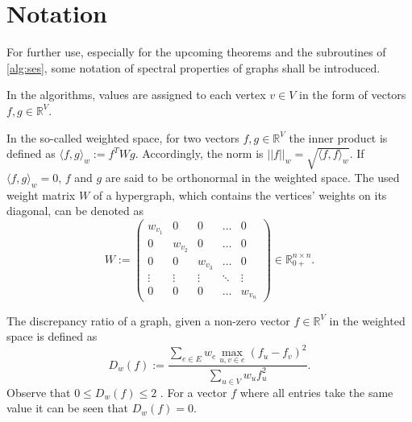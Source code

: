 \chapter{Notation}\label{chapter:notation}
For further use, especially for the upcoming theorems and the subroutines of \cref{alg:ses}, some notation of spectral properties of graphs shall be introduced.

In the algorithms, values are assigned to each vertex $v\in V$ in the form of vectors $f, g \in \mathbb{R}^V$. %

In the so-called weighted space, for two vectors $f, g \in \mathbb{R}^V$ the inner product is defined as $ \langle f,g \rangle_w := f^T W g$. Accordingly, the norm is $||f||_w = \sqrt{ \langle f,f \rangle_w}$.
If $ \langle f,g \rangle_w   = 0 $, $f$ and $g$ are said to be orthonormal in the weighted space. 
The used weight matrix $W$ of a hypergraph, which contains the vertices' weights on its diagonal, can be denoted as \begin{equation}
W := 
\begin{pmatrix}
w_{v_1} & 0 & 0&\dots &0 \\
0 & w_{v_2} & 0 & \ldots & 0 \\
0 & 0 & w_{v_3} & \ldots & 0 \\
\vdots & \vdots & \vdots & \ddots & \vdots \\
0 &0&0& \ldots  & w_{v_n}
\end{pmatrix} \in \mathbb{R}_{0+}^{n \times n} .
\end{equation} 

The discrepancy ratio of a graph, given a non-zero vector $f \in \mathbb{R}^V$ in the weighted space is defined as \begin{equation}\label{eq:discrepancy_ratio}
D_w(f) := \frac{\sum_{e\in E} w_e \max_{u,v\in e}(f_u - f_v)^2}{\sum_{u\in V} w_u f_u^2}.
\end{equation} 
Observe that $0\le D_w(f) \le 2 $ \cite{ChanLTZ16}. For a vector $f$ where all entries take the same value it can be seen that $D_w(f) =0$.
 
